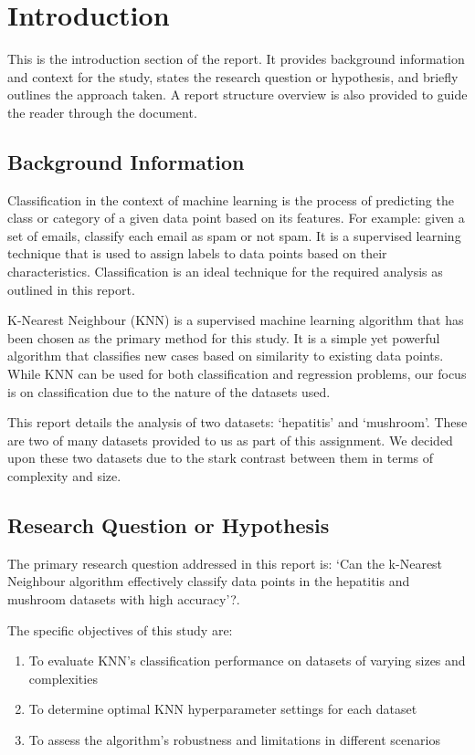 \section{Introduction}
\label{sec:introduction}

This is the introduction section of the report. It provides background information and context for the study, states the research question or hypothesis, and briefly outlines the approach taken.
A report structure overview is also provided to guide the reader through the document.

\subsection{Background Information}

Classification in the context of machine learning is the process of predicting the class or category of a given data point based on its features.
For example: given a set of emails, classify each email as spam or not spam. 
It is a supervised learning technique that is used to assign labels to data points based on their characteristics.
Classification is an ideal technique for the required analysis as outlined in this report.\par

K-Nearest Neighbour (KNN) is a supervised machine learning algorithm that has been chosen as the primary method for this study.
It is a simple yet powerful algorithm that classifies new cases based on similarity to existing data points.
While KNN can be used for both classification and regression problems, our focus is on classification due to the nature of the datasets used.\par

This report details the analysis of two datasets: `hepatitis' and `mushroom'. These are two of many datasets provided to us as part of this assignment.
We decided upon these two datasets due to the stark contrast between them in terms of complexity and size.

\subsection{Research Question or Hypothesis}
The primary research question addressed in this report is: `Can the k-Nearest Neighbour algorithm effectively classify
data points in the hepatitis and mushroom datasets with high accuracy'?.\par

The specific objectives of this study are:
\begin{enumerate}
    \item To evaluate KNN's classification performance on datasets of varying sizes and complexities
    \item To determine optimal KNN hyperparameter settings for each dataset
    \item To assess the algorithm's robustness and limitations in different scenarios
\end{enumerate}

